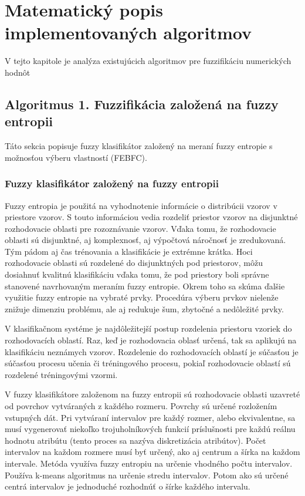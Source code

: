 \chapter{Matematický popis implementovaných algoritmov}
V tejto kapitole je analýza existujúcich algoritmov pre fuzzifikáciu numerických hodnôt




\section{Algoritmus 1.  Fuzzifikácia založená na fuzzy entropii } 

Táto sekcia popisuje fuzzy klasifikátor založený na meraní fuzzy entropie s možnosťou výberu vlastností (FEBFC).

\subsection{Fuzzy klasifikátor založený na fuzzy entropii}
Fuzzy entropia je použitá na vyhodnotenie informácie o distribúcii vzorov v priestore vzorov. S touto informáciou vedia rozdeliť priestor vzorov na disjunktné rozhodovacie oblasti pre rozoznávanie vzorov. Vďaka tomu, že rozhodovacie oblasti sú disjunktné, aj komplexnosť, aj výpočtová náročnosť je zredukovaná. Tým pádom aj čas trénovania a klasifikácie je extrémne krátka. Hoci rozhodovacie oblasti sú rozdelené do disjunktných pod priestorov, môžu dosiahnuť kvalitnú klasifikáciu vďaka tomu, že pod priestory boli správne stanovené navrhovaným meraním fuzzy entropie. Okrem toho sa skúma ďalšie využitie fuzzy entropie na vybraté prvky. Procedúra výberu prvkov nielenže znižuje dimenziu problému, ale aj redukuje šum, zbytočné a nedôležité prvky.\cite{lee2001}


V klasifikačnom systéme je najdôležitejší postup rozdelenia priestoru vzoriek do rozhodovacích oblastí. Raz, keď je rozhodovacia oblasť určená, tak sa aplikujú na klasifikáciu neznámych vzorov.  Rozdelenie do rozhodovacích oblastí je súčasťou je súčasťou procesu učenia či tréningového procesu, pokiaľ rozhodovacie oblastí sú rozdelené tréningovými vzormi. 

V fuzzy klasifikátore založenom na fuzzy entropii sú rozhodovacie oblasti uzavreté od povrchov vytváraných z každého rozmeru. Povrchy sú určené rozložením vstupných dát.  
Pri vytváraní intervalov pre každý rozmer, alebo ekvivalentne, sa musí vygenerovať niekoľko trojuholníkových funkcií príslušnosti pre každú reálnu hodnotu atribútu (tento proces sa nazýva diskretizácia atribútov).  \cite{lee2001}
Počet intervalov na každom rozmere musí byť určený, ako aj centrum a šírka na každom intervale.  Metóda využíva fuzzy entropiu na určenie vhodného počtu intervalov. Používa k-means algoritmus na určenie stredu intervalov. Potom ako sú určené centrá intervalov je jednoduché rozhodnúť o šírke každého intervalu.
